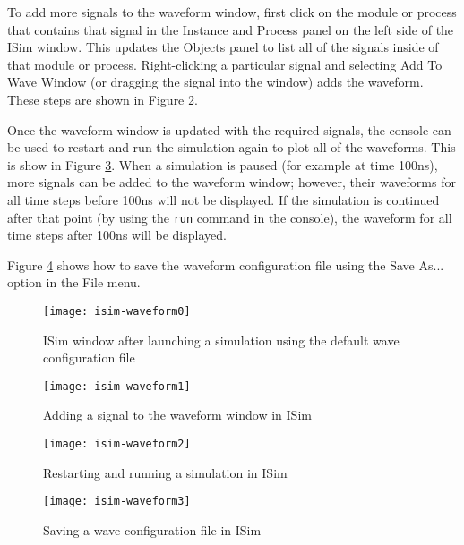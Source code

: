 To add more signals to the waveform window, first click on the module or process that contains that signal in the Instance and Process panel on the left side of the ISim window. This updates the Objects panel to list all of the signals inside of that module or process. Right-clicking a particular signal and selecting Add To Wave Window (or dragging the signal into the window) adds the waveform. These steps are shown in Figure \ref{fig:isim-waveform1}.

Once the waveform window is updated with the required signals, the console can be used to restart and run the simulation again to plot all of the waveforms. This is show in Figure \ref{fig:isim-waveform2}. When a simulation is paused (for example at time 100ns), more signals can be added to the waveform window; however, their waveforms for all time steps before 100ns will not be displayed. If the simulation is continued after that point (by using the \texttt{run} command in the console), the waveform for all time steps after 100ns will be displayed.

Figure \ref{fig:isim-waveform3} shows how to save the waveform configuration file using the Save As... option in the File menu.

\begin{figure}
	\centering
	\texttt{[image: isim-waveform0]}
	\caption{ISim window after launching a simulation using the default wave configuration file}
	\label{fig:isim-waveform0}
\end{figure}
\begin{figure}
	\centering
	\texttt{[image: isim-waveform1]}
	\caption{Adding a signal to the waveform window in ISim}
	\label{fig:isim-waveform1}
\end{figure}
\begin{figure}
	\centering
	\texttt{[image: isim-waveform2]}
	\caption{Restarting and running a simulation in ISim}
	\label{fig:isim-waveform2}
\end{figure}
\begin{figure}
	\centering
	\texttt{[image: isim-waveform3]}
	\caption{Saving a wave configuration file in ISim}
	\label{fig:isim-waveform3}
\end{figure}

